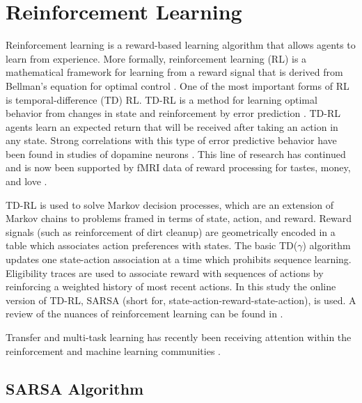 \section{Reinforcement Learning}
Reinforcement learning is a reward-based learning algorithm that allows agents
to learn from experience. More formally, reinforcement
learning (RL) is a mathematical framework for learning from a reward signal that
is derived from Bellman's equation for optimal control \cite{sutton1998introduction}. One of
the most important forms of RL is temporal-difference (TD) RL. TD-RL is a method
for learning optimal behavior from changes in state and reinforcement by error
prediction \cite{sutton1988learning}. TD-RL agents learn an expected return that will be
received after taking an action in any state. Strong correlations with this type of
error predictive behavior have been found in studies of dopamine neurons
\cite{schultz1993responses}. This line of research has continued and is now been
supported by fMRI data of reward processing for tastes, money, and love
\cite{haber2009reward}.

TD-RL is used to solve Markov decision processes, which are an extension of
Markov chains to problems framed in terms of state, action, and reward.
Reward signals (such as reinforcement of dirt cleanup) are geometrically encoded
in a table which associates action preferences with states. The basic
TD($\gamma$) algorithm updates one state-action association at a time which
prohibits sequence learning. Eligibility traces are used to associate reward
with sequences of actions by reinforcing a weighted history of most recent
actions. In this study the online version of TD-RL, SARSA (short for,
state-action-reward-state-action), is used. A review of the nuances of
reinforcement learning can be found in \cite{sutton1998introduction}.

Transfer and multi-task learning has recently been receiving attention within
the reinforcement and machine learning communities \cite{Li2009,Taylor2009}.

\subsection{SARSA Algorithm}

